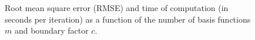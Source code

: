 \documentclass[]{interact}
\theoremstyle{plain}%
\theoremstyle{definition}
\theoremstyle{remark}
\begin{document}
\begin{figure}
\caption{Root mean square error (RMSE) and time of computation (in seconds per iteration) as a function of the number of basis functions $m$ and boundary factor $c$.}
  \label{fig22_rmse_leukemia}
\end{figure}
\end{document}
